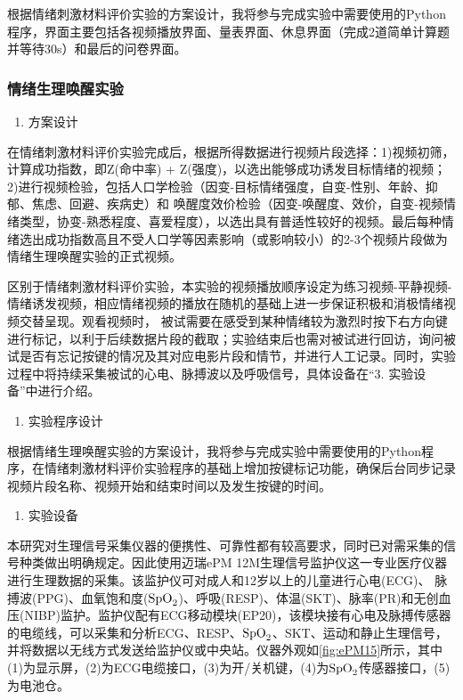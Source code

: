 根据情绪刺激材料评价实验的方案设计，我将参与完成实验中需要使用的Python程序，界面主要包括各视频播放界面、量表界面、休息界面（完成2道简单计算题并等待30s）和最后的问卷界面。

\subsubsection{情绪生理唤醒实验}
\begin{enumerate}[\hspace{2em}1.]
    \item 方案设计
\end{enumerate}

在情绪刺激材料评价实验完成后，根据所得数据进行视频片段选择：1)视频初筛，计算成功指数，即Z(命中率) + Z(强度)，以选出能够成功诱发目标情绪的视频；2)进行视频检验，包括人口学检验（因变-目标情绪强度，自变-性别、年龄、抑郁、焦虑、回避、疾病史）和
唤醒度效价检验（因变-唤醒度、效价，自变-视频情绪类型，协变-熟悉程度、喜爱程度），以选出具有普适性较好的视频。最后每种情绪选出成功指数高且不受人口学等因素影响（或影响较小）的2-3个视频片段做为情绪生理唤醒实验的正式视频。

区别于情绪刺激材料评价实验，本实验的视频播放顺序设定为练习视频-平静视频-情绪诱发视频，相应情绪视频的播放在随机的基础上进一步保证积极和消极情绪视频交替呈现。观看视频时，
被试需要在感受到某种情绪较为激烈时按下右方向键进行标记，以利于后续数据片段的截取；实验结束后也需对被试进行回访，询问被试是否有忘记按键的情况及其对应电影片段和情节，并进行人工记录。同时，实验过程中将持续采集被试的心电、脉搏波以及呼吸信号，具体设备在“3. 实验设备”中进行介绍。

\begin{enumerate}[\hspace{2em}2.]
    \item 实验程序设计
\end{enumerate}

根据情绪生理唤醒实验的方案设计，我将参与完成实验中需要使用的Python程序，在情绪刺激材料评价实验程序的基础上增加按键标记功能，确保后台同步记录视频片段名称、视频开始和结束时间以及发生按键的时间。

\begin{enumerate}[\hspace{2em}3.]
    \item 实验设备
\end{enumerate}

本研究对生理信号采集仪器的便携性、可靠性都有较高要求，同时已对需采集的信号种类做出明确规定。因此使用迈瑞ePM 12M生理信号监护仪这一专业医疗仪器进行生理数据的采集。该监护仪可对成人和12岁以上的儿童进行心电(ECG)、
脉搏波(PPG)、血氧饱和度(${\rm SpO}_{\rm 2}$)、呼吸(RESP)、体温(SKT)、脉率(PR)和无创血压(NIBP)监护。监护仪配有ECG移动模块(EP20)，该模块接有心电及脉搏传感器的电缆线，可以采集和分析ECG、RESP、${\rm SpO}_{\rm 2}$、SKT、运动和静止生理信号，
并将数据以无线方式发送给监护仪或中央站。仪器外观如\autoref{fig:ePM15}所示，其中(1)为显示屏，(2)为ECG电缆接口，(3)为开/关机键，(4)为${\rm SpO}_{\rm 2}$传感器接口，(5)为电池仓。

